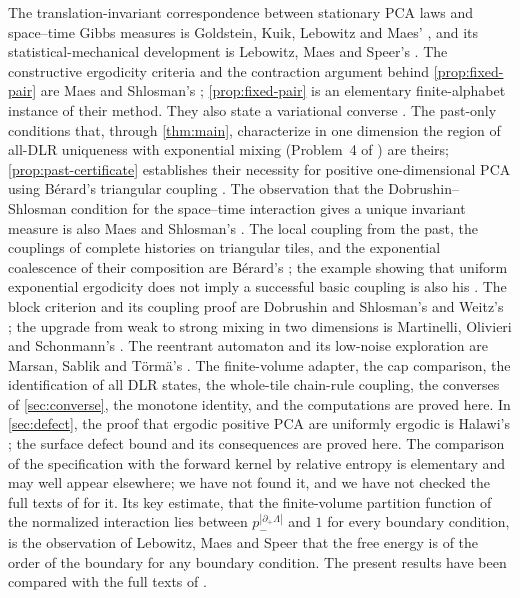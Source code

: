 \documentclass[11pt]{article}
\theoremstyle{plain}
\theoremstyle{definition}
\theoremstyle{remark}
\newcommand{\Lam}{\Lambda}
\begin{document}
The translation-invariant correspondence between stationary PCA laws and space--time Gibbs measures is Goldstein, Kuik, Lebowitz and Maes' \cite{GKLM89}, and its statistical-mechanical development is Lebowitz, Maes and Speer's \cite{LMS90}. The constructive ergodicity criteria and the contraction argument behind \cref{prop:fixed-pair} are Maes and Shlosman's \cite{MS91,MS93}; \cref{prop:fixed-pair} is an elementary finite-alphabet instance of their method. They also state a variational converse \cite[Theorem~2]{MS91}. The past-only conditions that, through \cref{thm:main}, characterize in one dimension the region of all-DLR uniqueness with exponential mixing (Problem~4 of \cite{LMS90}) are theirs; \cref{prop:past-certificate} establishes their necessity for positive one-dimensional PCA using B\'erard's triangular coupling \cite[Lemma~8]{Berard23}. The observation that the Dobrushin--Shlosman condition for the space--time interaction gives a unique invariant measure is also Maes and Shlosman's \cite[p.~235]{MS91}. The local coupling from the past, the couplings of complete histories on triangular tiles, and the exponential coalescence of their composition are B\'erard's \cite{Berard23}; the example showing that uniform exponential ergodicity does not imply a successful basic coupling is also his \cite[Proposition~1 and Theorem~1]{Berard22}. The block criterion and its coupling proof are Dobrushin and Shlosman's \cite{DS85} and Weitz's \cite{Weitz05}; the upgrade from weak to strong mixing in two dimensions is Martinelli, Olivieri and Schonmann's \cite{MOS94}. The reentrant automaton and its low-noise exploration are Marsan, Sablik and T\"orm\"a's \cite{MST26}. The finite-volume adapter, the cap comparison, the identification of all DLR states, the whole-tile chain-rule coupling, the converses of \cref{sec:converse}, the monotone identity, and the computations are proved here. In \cref{sec:defect}, the proof that ergodic positive PCA are uniformly ergodic is Halawi's \cite{Halawi22}; the surface defect bound and its consequences are proved here. The comparison of the specification with the forward kernel by relative entropy is elementary and may well appear elsewhere; we have not found it, and we have not checked the full texts of \cite{KV80,Toom90} for it. Its key estimate, that the finite-volume partition function of the normalized interaction lies between $p_-^{|\partial_+\Lam|}$ and $1$ for every boundary condition, is the observation of Lebowitz, Maes and Speer \cite[Section~1.3]{LMS90} that the free energy is of the order of the boundary for any boundary condition. The present results have been compared with the full texts of \cite{MS91,MS93,LMS90}.
\end{document}
